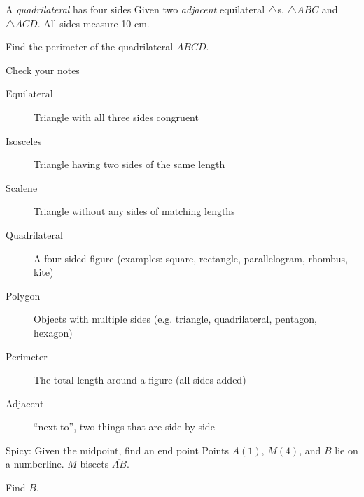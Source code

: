 \begin{frame}{A \emph{quadrilateral} has four sides}
  Given two \emph{adjacent} equilateral $\triangle$s, $\triangle ABC$ and $\triangle ACD$. All sides measure 10 cm. 
  \begin{center}
  \end{center} \bigskip
  Find the perimeter of the quadrilateral $ABCD$. \vspace{3cm}
  \end{frame}

\begin{frame}{Check your notes}
  \begin{description}
    \item[Equilateral] Triangle with all three sides congruent
    \item[Isosceles] Triangle having two sides of the same length
    \item[Scalene] Triangle without any sides of matching lengths
    \item[Quadrilateral] A four-sided figure (examples: square, rectangle, parallelogram, rhombus, kite)
    \item[Polygon] Objects with multiple sides (e.g. triangle, quadrilateral, pentagon, hexagon)
    \item[Perimeter] The total length around a figure (all sides added)
    \item[Adjacent] ``next to'', two things that are side by side
  \end{description}
\end{frame}

\begin{frame}{Spicy: Given the midpoint, find an end point}
  Points $A(1)$, $M(4)$, and $B$ lie on a numberline. $M$ bisects $\overline{AB}$. \par \medskip
  Find $B$.
  \begin{center}
  \end{center}\vspace{2cm}
\end{frame}

